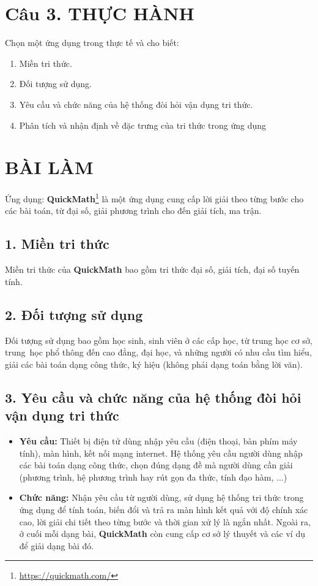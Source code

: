 \documentclass[a4paper]{article}
\begin{document}
\section*{Câu 3. THỰC HÀNH}	
Chọn một ứng dụng trong thực tế và cho biết:

\begin{enumerate} 
	\item Miền tri thức. 
	\item Đối tượng sử dụng. 
	\item Yêu cầu và chức năng của hệ thống đòi hỏi vận dụng tri thức. 
	\item Phân tích và nhận định về đặc trưng của tri thức trong ứng dụng
\end{enumerate}


\section*{BÀI LÀM}
Ứng dụng: \textbf{QuickMath}\footnote{\url{https://quickmath.com/}} là một ứng dụng cung cấp lời giải theo từng bước cho các bài toán, từ đại số, giải phương trình cho đến giải tích, ma trận.



\subsection* {1. Miền tri thức}
Miền tri thức của \textbf{QuickMath} bao gồm tri thức đại số, giải tích, đại số tuyến tính.

\subsection*{2. Đối tượng sử dụng}
Đối tượng sử dụng bao gồm học sinh, sinh viên ở các cấp học, từ trung học cơ sở, trung~học phổ thông đến cao đẳng, đại học, và những người có nhu cầu tìm hiểu, giải các bài toán dạng công thức, ký hiệu (không phải dạng toán bằng lời văn).

\subsection*{3. Yêu cầu và chức năng của hệ thống đòi hỏi vận dụng tri thức}
\begin{itemize}
	\item \textbf{Yêu cầu: }Thiết bị điện tử dùng nhập yêu cầu (điện thoại, bàn phím máy tính), màn hình, kết nối mạng internet. Hệ thống yêu cầu người dùng nhập các bài toán dạng công thức, chọn đúng dạng đề mà người dùng cần giải (phương trình, hệ phương trình hay rút gọn đa thức, tính đạo hàm, ...)
	\item \textbf{Chức năng: } Nhận yêu cầu từ người dùng, sử dụng hệ thống tri thức trong ứng dụng để tính toán, biến đổi và trả ra màn hình kết quả với độ chính xác cao, lời giải chi tiết theo từng bước và thời gian xử lý là ngắn nhất. Ngoài ra, ở cuối mỗi dạng bài, \textbf{QuickMath} còn cung cấp cơ sở lý thuyết và các ví dụ để giải dạng bài đó.
\end{itemize}
\end{document}
